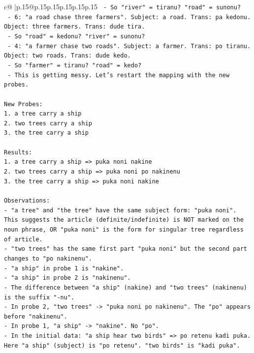 \documentclass{article}
\begin{document}
{\begin{supertabular}{c@{$\;$}|p{.15\linewidth}@{}p{.15\linewidth}p{.15\linewidth}p{.15\linewidth}p{.15\linewidth}p{.15\linewidth}}
{{{\texttt{  {-} So "river" = tiranu? "road" = sunonu?} \\
\texttt{  {-} 6: "a road chase three farmers". Subject: a road. Trans: pa kedonu. Object: three farmers. Trans: dude tira.} \\
\texttt{  {-} So "road" = kedonu? "river" = sunonu?} \\
\texttt{  {-} 4: "a farmer chase two roads". Subject: a farmer. Trans: po tiranu. Object: two roads. Trans: dude kedo.} \\
\texttt{  {-} So "farmer" = tiranu? "road" = kedo?} \\
\texttt{  {-} This is getting messy. Let's restart the mapping with the new probes.} \\
\\ 
\texttt{New Probes:} \\
\texttt{1. a tree carry a ship} \\
\texttt{2. two trees carry a ship} \\
\texttt{3. the tree carry a ship} \\
\\ 
\texttt{Results:} \\
\texttt{1. a tree carry a ship => puka noni nakine} \\
\texttt{2. two trees carry a ship => puka noni po nakinenu} \\
\texttt{3. the tree carry a ship => puka noni nakine} \\
\\ 
\texttt{Observations:} \\
\texttt{{-} "a tree" and "the tree" have the same subject form: "puka noni". This suggests the article (definite/indefinite) is NOT marked on the noun phrase, OR "puka noni" is the form for singular tree regardless of article.} \\
\texttt{{-} "two trees" has the same first part "puka noni" but the second part changes to "po nakinenu".} \\
\texttt{{-} "a ship" in probe 1 is "nakine".} \\
\texttt{{-} "a ship" in probe 2 is "nakinenu".} \\
\texttt{{-} The difference between "a ship" (nakine) and "two trees" (nakinenu) is the suffix "{-}nu".} \\
\texttt{{-} In probe 2, "two trees" {-}> "puka noni po nakinenu". The "po" appears before "nakinenu".} \\
\texttt{{-} In probe 1, "a ship" {-}> "nakine". No "po".} \\
\texttt{{-} In the initial data: "a ship hear two birds" => po retenu kadi puka. Here "a ship" (subject) is "po retenu". "two birds" is "kadi puka".} \\
}}}
\end{supertabular}}
\end{document}
